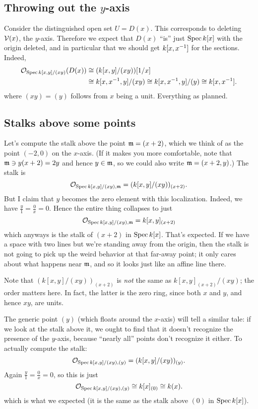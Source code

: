 \subsection{Throwing out the $y$-axis}
Consider the distinguished open set $U = D(x)$.
This corresponds to deleting $\mathcal V(x)$, the $y$-axis.
Therefore we expect that $D(x)$
``is'' just $\operatorname{Spec} k[x]$ with the origin deleted,
and in particular that we should get $k[x, x^{-1}]$
for the sections.
Indeed,
\begin{align*}
	\mathcal O_{\operatorname{Spec} k[x,y]/(xy)} (D(x))
	&\cong (k[x,y]/(xy))[1/x] \\
	&\cong k[x, x^{-1}, y] / (xy) \cong k[x, x^{-1}, y] / (y) \cong k[x, x^{-1}].
\end{align*}
where $(xy) = (y)$ follows from $x$ being a unit.
Everything as planned.

\subsection{Stalks above some points}
Let's compute the stalk above the point $\mathfrak m = (x+2)$,
which we think of as the point $(-2,0)$ on the $x$-axis.
(If it makes you more comfortable, note that $\mathfrak m \ni y(x+2) = 2y$
and hence $y \in \mathfrak m$, so we could also write $\mathfrak m = (x+2,y)$.)
The stalk is
\[ \mathcal O_{\operatorname{Spec} k[x,y] / (xy), \mathfrak m} = (k[x,y]/ (xy))_{(x+2)}. \]
But I claim that $y$ becomes the zero element with this localization.
Indeed, we have $\frac y1 = \frac 0x = 0$.
Hence the entire thing collapses to just
\[ \mathcal O_{\operatorname{Spec} k[x,y] / (xy), \mathfrak m} = k[x,y]_{(x+2)} \]
which anyways is the stalk of $(x+2)$ in $\operatorname{Spec} k[x]$.
That's expected.
If we have a space with two lines but we're
standing away from the origin,
then the stalk is not going to pick up the weird behavior
at that far-away point;
it only cares about what happens near $\mathfrak m$,
and so it looks just like an affine line there.

\begin{remark}
	Note that $(k[x,y]/ (xy))_{(x+2)}$
	is \emph{not} the same as $k[x,y]_{(x+2)} / (xy)$;
	the order matters here.
	In fact, the latter is the zero ring,
	since both $x$ and $y$, and hence $xy$, are units.
\end{remark}

The generic point $(y)$ (which floats around the $x$-axis)
will tell a similar tale:
if we look at the stalk above it,
we ought to find that it doesn't recognize the presence of the $y$-axis,
because ``nearly all'' points don't recognize it either.
To actually compute the stalk:
\[ \mathcal O_{\operatorname{Spec} k[x,y] / (xy), (y)} = (k[x,y]/ (xy))_{(y)}. \]
Again $\frac y1 = \frac 0x = 0$, so this is just
\[ \mathcal O_{\operatorname{Spec} k[x,y] / (xy), (y)} \cong k[x]_{(0)} \cong k(x). \]
which is what we expected
(it is the same as the stalk above $(0)$ in $\operatorname{Spec} k[x]$).

